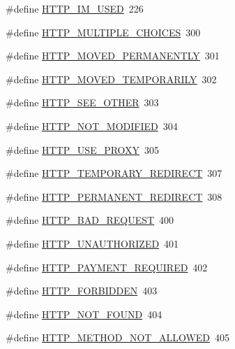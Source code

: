 \begin{DoxyCompactItemize}
\#define \hyperlink{group__HTTP__Status_ga99382ca4f73c90f5806bb289eae7d4fa}{H\+T\+T\+P\+\_\+\+I\+M\+\_\+\+U\+S\+ED}~226
\item 
\#define \hyperlink{group__HTTP__Status_ga0020e1d43d11d956809d64654fd6988b}{H\+T\+T\+P\+\_\+\+M\+U\+L\+T\+I\+P\+L\+E\+\_\+\+C\+H\+O\+I\+C\+ES}~300
\item 
\#define \hyperlink{group__HTTP__Status_ga9ff5a45ec521f0b2d39a17087b9a60da}{H\+T\+T\+P\+\_\+\+M\+O\+V\+E\+D\+\_\+\+P\+E\+R\+M\+A\+N\+E\+N\+T\+LY}~301
\item 
\#define \hyperlink{group__HTTP__Status_ga84d570ec8ad2a734b395141f5c67dc58}{H\+T\+T\+P\+\_\+\+M\+O\+V\+E\+D\+\_\+\+T\+E\+M\+P\+O\+R\+A\+R\+I\+LY}~302
\item 
\#define \hyperlink{group__HTTP__Status_ga1a8913a933dfe4d26a328d57fec0fa70}{H\+T\+T\+P\+\_\+\+S\+E\+E\+\_\+\+O\+T\+H\+ER}~303
\item 
\#define \hyperlink{group__HTTP__Status_ga4ca0e7d2bc7164156ded3b31e7d51c77}{H\+T\+T\+P\+\_\+\+N\+O\+T\+\_\+\+M\+O\+D\+I\+F\+I\+ED}~304
\item 
\#define \hyperlink{group__HTTP__Status_gaea9903a7f87cb6701a1cfb29f04a9cd3}{H\+T\+T\+P\+\_\+\+U\+S\+E\+\_\+\+P\+R\+O\+XY}~305
\item 
\#define \hyperlink{group__HTTP__Status_gae6d4ecde2bc6052a3474c3b1592eb712}{H\+T\+T\+P\+\_\+\+T\+E\+M\+P\+O\+R\+A\+R\+Y\+\_\+\+R\+E\+D\+I\+R\+E\+CT}~307
\item 
\#define \hyperlink{group__HTTP__Status_ga8b5ce939a6c68f4a9a4c37d205a2eeaa}{H\+T\+T\+P\+\_\+\+P\+E\+R\+M\+A\+N\+E\+N\+T\+\_\+\+R\+E\+D\+I\+R\+E\+CT}~308
\item 
\#define \hyperlink{group__HTTP__Status_ga0c1fdbbb10800664989907cbd3a5a023}{H\+T\+T\+P\+\_\+\+B\+A\+D\+\_\+\+R\+E\+Q\+U\+E\+ST}~400
\item 
\#define \hyperlink{group__HTTP__Status_gac4cfa4b7a737abff1264ddba3752a2ad}{H\+T\+T\+P\+\_\+\+U\+N\+A\+U\+T\+H\+O\+R\+I\+Z\+ED}~401
\item 
\#define \hyperlink{group__HTTP__Status_gac05943d3542b1f3e9d289f3427cea690}{H\+T\+T\+P\+\_\+\+P\+A\+Y\+M\+E\+N\+T\+\_\+\+R\+E\+Q\+U\+I\+R\+ED}~402
\item 
\#define \hyperlink{group__HTTP__Status_ga92646f876056a1e5013e0050496dc04d}{H\+T\+T\+P\+\_\+\+F\+O\+R\+B\+I\+D\+D\+EN}~403
\item 
\#define \hyperlink{group__HTTP__Status_gabd505b5244bd18ae61c581484b4bc5a0}{H\+T\+T\+P\+\_\+\+N\+O\+T\+\_\+\+F\+O\+U\+ND}~404
\item 
\#define \hyperlink{group__HTTP__Status_ga9089f2da2b4b844931500848e2dce01c}{H\+T\+T\+P\+\_\+\+M\+E\+T\+H\+O\+D\+\_\+\+N\+O\+T\+\_\+\+A\+L\+L\+O\+W\+ED}~405

\end{DoxyCompactItemize}
